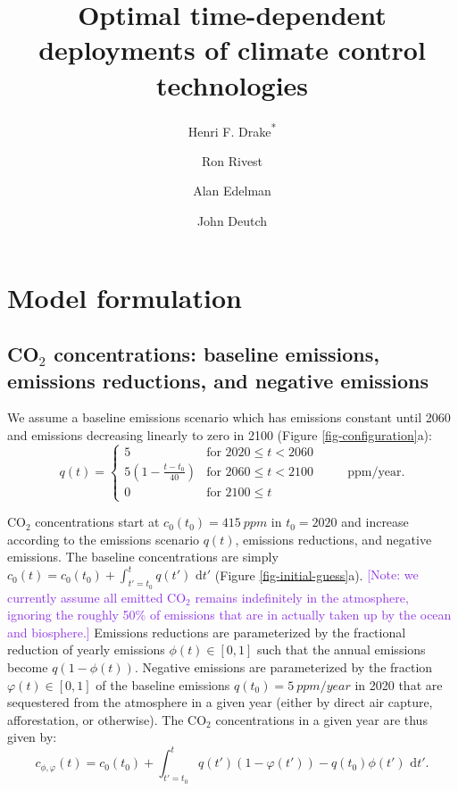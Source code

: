 \documentclass{article}
\title{Optimal time-dependent deployments of climate control technologies}
\author[1,2]{Henri F. Drake\textsuperscript{*}}
\author[1]{Ron Rivest}
\author[1]{Alan Edelman}
\author[1]{John Deutch}
\affil[1]{Massachusetts Institute of Technology, Cambridge, MA, USA}
\affil[2]{Woods Hole Oceanographic Institution, Woods Hole, MA, USA}
\date{}             %
\begin{document}
\maketitle

\section{Model formulation}

\subsection{CO$_{2}$ concentrations: baseline emissions, emissions reductions, and negative emissions}

We assume a baseline emissions scenario which has emissions constant until 2060 and emissions decreasing linearly to zero in 2100 (Figure \ref{fig-configuration}a):
\begin{equation}
  q(t)=\begin{cases}
        5
        & \text{for $2020 \leq t < 2060$}\\
        5 (1 - \frac{t-t_{0}}{40})
        & \text{for $2060 \leq t < 2100$}\\
        0
        & \text{for  $2100 \leq t$}
       \end{cases} \quad\quad \text{ ppm/year}.
\end{equation}

CO$_{2}$ concentrations start at $c_{0}(t_{0}) = \SI{415}{ppm}$ in $t_{0}=2020$ and increase according to the emissions scenario $q(t)$, emissions reductions, and negative emissions. The baseline concentrations are simply $c_{0}(t) = c_{0}(t_{0}) + \int_{t'=t_{0}}^{t} q(t') \text{ d}t'$ (Figure \ref{fig-initial-guess}a). \textcolor{BlueViolet}{[Note: we currently assume all emitted CO$_{2}$ remains indefinitely in the atmosphere, ignoring the roughly 50\% of emissions that are in actually taken up by the ocean and biosphere.]} Emissions reductions are parameterized by the fractional reduction of yearly emissions $\phi(t) \in [0,1]$ such that the annual emissions become $q(1-\phi(t))$. Negative emissions are parameterized by the fraction $\varphi(t) \in [0,1]$ of the baseline emissions $q(t_{0}) = \SI{5}{ppm/year}$ in 2020 that are sequestered from the atmosphere in a given year (either by direct air capture, afforestation, or otherwise). The CO$_{2}$ concentrations in a given year are thus given by:
\begin{equation}
    c_{\phi, \varphi}(t) = c_{0}(t_{0}) + \int_{t'=t_{0}}^{t} q(t')(1-\varphi(t')) - q(t_{0}) \phi(t') \text{ d}t'.\label{eq-CO2-conc}
\end{equation}
\end{document}
